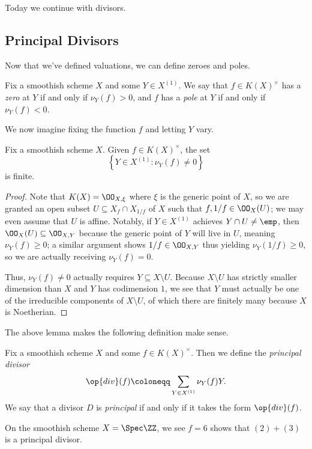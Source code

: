 \documentclass[../notes.tex]{subfiles}
\begin{document}
Today we continue with divisors.

\subsection{Principal Divisors}
Now that we've defined valuations, we can define zeroes and poles.
\begin{defihelper}  
	Fix a smoothish scheme $X$ and some $Y\in X^{(1)}$. We say that $f\in K(X)^\times$ has a \textit{zero} at $Y$ if and only if $\nu_Y(f)>0$, and $f$ has a \textit{pole} at $Y$ if and only if $\nu_Y(f)<0$.
\end{defihelper}
We now imagine fixing the function $f$ and letting $Y$ vary.
\begin{lemma} \label{lem:function-has-finite-supp}
	Fix a smoothish scheme $X$. Given $f\in K(X)^\times$, the set
	\[\left\{Y\in X^{(1)}:\nu_Y(f)\ne0\right\}\]
	is finite.
\end{lemma}
\begin{proof}
	Note that $K(X)=\OO_{X,\xi}$ where $\xi$ is the generic point of $X$, so we are granted an open subset $U\subseteq X_f\cap X_{1/f}$ of $X$ such that $f,1/f\in \OO_X(U)$; we may even assume that $U$ is affine. Notably, if $Y\in X^{(1)}$ achieves $Y\cap U\ne\emp$, then $\OO_X(U)\subseteq\OO_{X,Y}$ because the generic point of $Y$ will live in $U$, meaning $\nu_Y(f)\ge0$; a similar argument shows $1/f\in\OO_{X,Y}$ thus yielding $\nu_Y(1/f)\ge0$, so we are actually receiving $\nu_Y(f)=0$.

	Thus, $\nu_Y(f)\ne0$ actually requires $Y\subseteq X\setminus U$. Because $X\setminus U$ has strictly smaller dimension than $X$ and $Y$ has codimension $1$, we see that $Y$ must actually be one of the irreducible components of $X\setminus U$, of which there are finitely many because $X$ is Noetherian.
\end{proof}
The above lemma makes the following definition make sense.
\begin{definition}
	Fix a smoothish scheme $X$ and some $f\in K(X)^\times$. Then we define the \textit{principal divisor}
	\[\op{div}(f)\coloneqq\sum_{Y\in X^{(1)}}\nu_Y(f)Y.\]
	We say that a divisor $D$ is \textit{principal} if and only if it takes the form $\op{div}(f)$.
\end{definition}
\begin{example}
	On the smoothish scheme $X=\Spec\ZZ$, we see $f=6$ shows that $(2)+(3)$ is a principal divisor.
\end{example}
\end{document}
